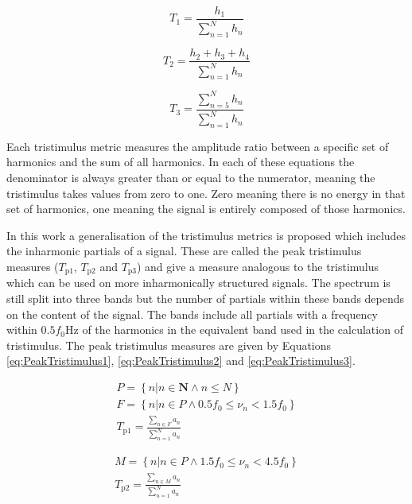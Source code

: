 			\begin{equation}
				T_{1} = \frac{h_{1}}{\sum_{n = 1}^{N} h_{n}}
				\label{eq:Tristimulus1}
			\end{equation}

			\begin{equation}
				T_{2} = \frac{h_{2} + h_{3} + h_{4}}{\sum_{n = 1}^{N} h_{n}}
				\label{eq:Tristimulus2}
			\end{equation}

			\begin{equation}
				T_{3} = \frac{\sum_{n = 5}^{N} h_{n}}{\sum_{n = 1}^{N} h_{n}}
				\label{eq:Tristimulus3}
			\end{equation}

			Each tristimulus metric measures the amplitude ratio between a specific set of harmonics and the
			sum of all harmonics. In each of these equations the denominator is always greater than or equal to
			the numerator, meaning the tristimulus takes values from zero to one. Zero meaning there is no
			energy in that set of harmonics, one meaning the signal is entirely composed of those harmonics.

			In this work a generalisation of the tristimulus metrics is proposed which includes the inharmonic
			partials of a signal. These are called the peak tristimulus measures ($T_{\mathrm{p}1}$,
			$T_{\mathrm{p}2}$ and $T_{\mathrm{p}3}$) and give a measure analogous to the tristimulus which can
			be used on more inharmonically structured signals. The spectrum is still split into three bands but
			the number of partials within these bands depends on the content of the signal. The bands include
			all partials with a frequency within $0.5f_{0}$Hz of the harmonics in the equivalent band used in
			the calculation of tristimulus.  The peak tristimulus measures are given by Equations
			\ref{eq:PeakTristimulus1}, \ref{eq:PeakTristimulus2} and \ref{eq:PeakTristimulus3}.

			\begin{gather}
				P = \left\{ n | n \in \textbf{N} \land n \leq N \right\} \nonumber \\
				F = \left\{ n | n \in P \land 0.5f_{0} \leq \nu_{n} < 1.5f_{0} \right\} \nonumber \\
				T_{\mathrm{p}1} = \frac{\sum_{n \in F} a_{n}}{\sum_{n = 1}^{N} a_{n}}
				\label{eq:PeakTristimulus1}
			\end{gather}

			\begin{gather}
				M = \left\{ n | n \in P \land 1.5f_{0} \leq \nu_{n} < 4.5f_{0} \right\} \nonumber \\
				T_{\mathrm{p}2} = \frac{\sum_{n \in M} a_{n}}{\sum_{n = 1}^{N} a_{n}}
				\label{eq:PeakTristimulus2}
			\end{gather}

